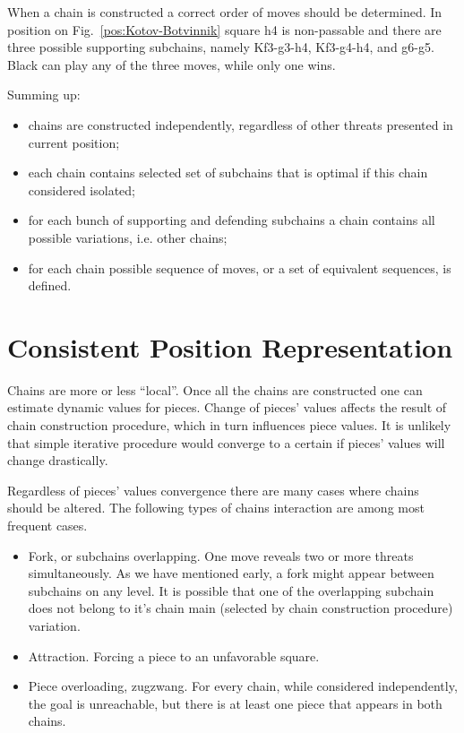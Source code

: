 \documentclass{llncs}
\begin{document}
When a chain is constructed a correct order of moves should be
determined.  In position on Fig.~\ref{pos:Kotov-Botvinnik} square h4
is non-passable and there are three possible supporting subchains,
namely Kf3-g3-h4, Kf3-g4-h4, and g6-g5. Black can play any of the
three moves, while only one wins.

Summing up:
\begin{itemize}
\item chains are constructed independently, regardless of other threats presented in current position;
\item each chain contains selected set of subchains that is optimal if this chain considered isolated;
\item for each bunch of supporting and defending subchains a chain contains all possible variations, i.e. other chains;
\item for each chain possible sequence of moves, or a set of equivalent sequences, is defined.
\end{itemize}


\section{Consistent Position Representation}
Chains are more or less ``local''. Once all the chains are constructed
one can estimate dynamic values for pieces. Change of pieces' values
affects the result of chain construction procedure, which in turn
influences piece values. It is unlikely that simple iterative
procedure would converge to a certain if pieces' values will change
drastically.

Regardless of pieces' values convergence there are many cases where
chains should be altered. The following types of chains interaction
are among most frequent cases.
\begin{itemize}
\item Fork, or subchains overlapping. One move reveals two or more
  threats simultaneously. As we have mentioned early, a fork might
  appear between subchains on any level. It is possible that one of
  the overlapping subchain does not belong to it's chain main
  (selected by chain construction procedure) variation.
\item Attraction. Forcing a piece to an unfavorable square.
\item Piece overloading, zugzwang. For every chain, while considered
  independently, the goal is unreachable, but there is at least one
  piece that appears in both chains.
\end{itemize}
\end{document}
